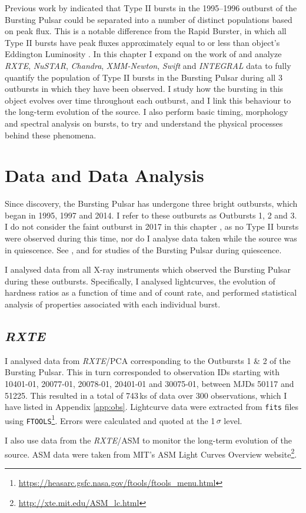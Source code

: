 \par Previous work by \citet{Giles_BP} indicated that Type II bursts in the 1995--1996 outburst of the Bursting Pulsar could be separated into a number of distinct populations based on peak flux.  This is a notable difference from the Rapid Burster, in which all Type II bursts have peak fluxes approximately equal to or less than object's Eddington Luminosity \citep{Tan_RBBursts}.  In this chapter I expand on the work of \citet{Giles_BP} and analyze \textit{RXTE}, \textit{NuSTAR}, \textit{Chandra}, \textit{XMM-Newton}, \textit{Swift} and \textit{INTEGRAL} data to fully quantify the population of Type II bursts in the Bursting Pulsar during all 3 outbursts in which they have been observed.  I study how the bursting in this object evolves over time throughout each outburst, and I link this behaviour to the long-term evolution of the source.  I also perform basic timing, morphology and spectral analysis on bursts, to try and understand the physical processes behind these phenomena.

\section{Data and Data Analysis}

\par Since discovery, the Bursting Pulsar has undergone three bright outbursts, which began in 1995, 1997 and 2014.  I refer to these outbursts as Outbursts 1, 2 and 3.  I do not consider the faint outburst in 2017 in this chapter \citep{Sanna_BPOutburst}, as no Type II bursts were observed during this time, nor do I analyse data taken while the source was in quiescence.  See \citet{Daigne_BPQ}, \citet{Wijnands_BPQ} and \citet{Degenaar_BPQuiescence} for studies of the Bursting Pulsar during quiescence.
\par I analysed data from all X-ray instruments which observed the Bursting Pulsar during these outbursts.  Specifically, I analysed lightcurves, the evolution of hardness ratios as a function of time and of count rate, and performed statistical analysis of properties associated with each individual burst.

\subsection{\textit{RXTE}}

\par I analysed data from \textit{RXTE}/PCA corresponding to the Outbursts 1 \& 2 of the Bursting Pulsar.  This in turn corresponded to observation IDs starting with 10401-01, 20077-01, 20078-01, 20401-01 and 30075-01, between MJDs 50117 and 51225.  This resulted in a total of 743\,ks of data over 300 observations, which I have listed in Appendix \ref{app:obs}. Lightcurve data were extracted from \texttt{fits} files using \texttt{FTOOLS}\footnote{\url{https://heasarc.gsfc.nasa.gov/ftools/ftools_menu.html}}.  Errors were calculated and quoted at the 1$\,\sigma$ level.
\par I also use data from the \textit{RXTE}/ASM to monitor the long-term evolution of the source.  ASM data were taken from MIT's ASM Light Curves Overview website\footnote{\url{http://xte.mit.edu/ASM_lc.html}}.

